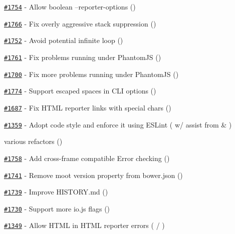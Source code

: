 \begin{DoxyItemize}
\item \href{https://github.com/mochajs/mocha/issues/1754}{\tt \#1754} -\/ Allow boolean --reporter-\/options (\href{https://github.com/papandreou}{\tt })
\item \href{https://github.com/mochajs/mocha/issues/1766}{\tt \#1766} -\/ Fix overly aggressive stack suppression (\href{https://github.com/moll}{\tt })
\item \href{https://github.com/mochajs/mocha/issues/1752}{\tt \#1752} -\/ Avoid potential infinite loop (\href{https://github.com/gsilk}{\tt })
\item \href{https://github.com/mochajs/mocha/issues/1761}{\tt \#1761} -\/ Fix problems running under Phantom\+JS (\href{https://github.com/chromakode}{\tt })
\item \href{https://github.com/mochajs/mocha/issues/1700}{\tt \#1700} -\/ Fix more problems running under Phantom\+JS (\href{https://github.com/jbnicolai}{\tt })
\item \href{https://github.com/mochajs/mocha/issues/1774}{\tt \#1774} -\/ Support escaped spaces in C\+LI options (\href{https://github.com/adamgruber}{\tt })
\item \href{https://github.com/mochajs/mocha/issues/1687}{\tt \#1687} -\/ Fix H\+T\+ML reporter links with special chars (\href{https://github.com/benvinegar}{\tt })
\item \href{https://github.com/mochajs/mocha/issues/1359}{\tt \#1359} -\/ Adopt code style and enforce it using E\+S\+Lint (\href{https://github.com/ndhoule}{\tt } w/ assist from \href{https://github.com/jbnicolai}{\tt } \& \href{https://github.com/boneskull}{\tt })
\item various refactors (\href{https://github.com/jbnicolai}{\tt })
\item \href{https://github.com/mochajs/mocha/issues/1758}{\tt \#1758} -\/ Add cross-\/frame compatible Error checking (\href{https://github.com/outdooricon}{\tt })
\item \href{https://github.com/mochajs/mocha/issues/1741}{\tt \#1741} -\/ Remove moot {\ttfamily version} property from bower.\+json (\href{https://github.com/kkirsche}{\tt })
\item \href{https://github.com/mochajs/mocha/issues/1739}{\tt \#1739} -\/ Improve {\ttfamily H\+I\+S\+T\+O\+R\+Y.\+md} (\href{https://github.com/rstacruz}{\tt })
\item \href{https://github.com/mochajs/mocha/issues/1730}{\tt \#1730} -\/ Support more io.\+js flags (\href{https://github.com/ryedog}{\tt })
\item \href{https://github.com/mochajs/mocha/issues/1349}{\tt \#1349} -\/ Allow H\+T\+ML in H\+T\+ML reporter errors (\href{https://github.com/papandreou}{\tt } / \href{https://github.com/sunesimonsen}{\tt })

\end{DoxyItemize}
